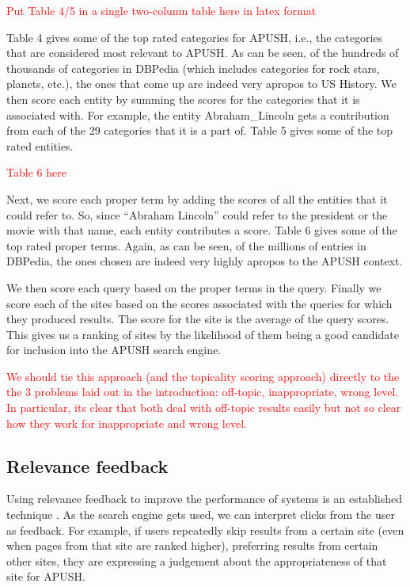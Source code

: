\documentclass{acm_proc_article-sp}
\begin{document}
\textcolor{red}{Put Table 4/5 in a single two-column table here in latex format}

Table 4 gives some of the top rated
categories for APUSH, i.e., the categories that are considered most relevant to
APUSH. As can be seen, of the hundreds of thousands of categories in
DBPedia (which includes categories for rock stars, planets, etc.), the
ones that come up are indeed very apropos to US History.           
We then score each entity by summing the scores for the categories that it is
associated with. For example, the entity Abraham\_Lincoln gets a contribution
from each of the 29 categories that it is a part of. Table 5 gives some of the
top rated entities. 

\textcolor{red}{Table 6 here}

Next, we score each proper term by adding the scores of all the entities that it
could refer to. So, since ``Abraham Lincoln'' could refer to the president or the
movie with that name, each entity contributes a score. Table 6 gives some of the
top rated proper terms. Again, as can be seen, of the millions of entries in
DBPedia, the ones chosen are indeed very highly apropos to the APUSH context. 

We then score each query based on the proper terms in the query. Finally we
score each of the sites based on the scores associated with the queries for
which they produced results. The score for the site is the average of the query
scores. This gives us a ranking of sites by the likelihood of them being a good
candidate for inclusion into the APUSH search engine. 


\textcolor{red}{We should tie this approach (and the topicality scoring
  approach) directly to the the 3 problems laid out in the introduction:
  off-topic, inappropriate, wrong level. In particular, 
  its clear that both deal with off-topic results easily but not so clear how
  they work for inappropriate and wrong level.}

\subsection{Relevance feedback}

Using relevance feedback to improve the performance of systems is an established
technique \cite{salton1997improving}. As the search engine gets used, we can
interpret clicks from the user as feedback. For example, if users repeatedly
skip results from a certain site (even when pages from that site are ranked
higher), preferring results from certain other sites, they are expressing a
judgement about the appropriateness of that site for APUSH. 
\end{document}
